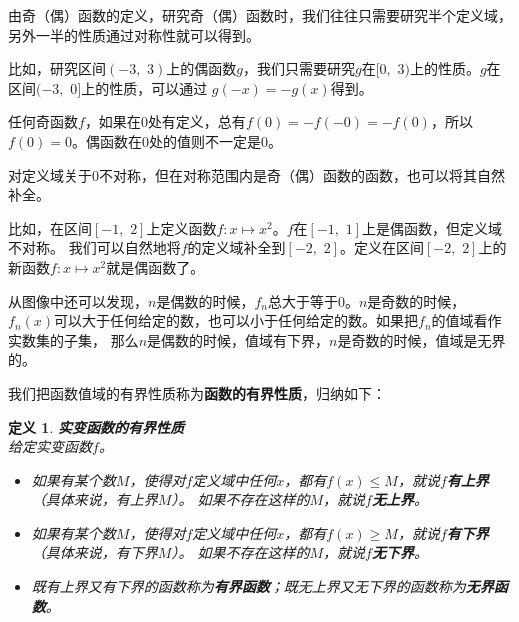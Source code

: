 \documentclass[12pt,UTF8]{ctexbook}
\newtheorem{df}{定义}[section]
\begin{document}
由奇（偶）函数的定义，研究奇（偶）函数时，我们往往只需要研究半个定义域，另外一半的性质通过对称性就可以得到。

比如，研究区间$(-3, \,\,3)$上的偶函数$g$，我们只需要研究$g$在$[0, \,\,3)$上的性质。$g$在区间$(-3,\,\,0]$上的性质，可以通过
$g(-x) = -g(x)$得到。

任何奇函数$f$，如果在$0$处有定义，总有$f(0) = - f(-0) = - f(0)$，所以$f(0) = 0$。偶函数在$0$处的值则不一定是$0$。

对定义域关于$0$不对称，但在对称范围内是奇（偶）函数的函数，也可以将其自然补全。

比如，在区间$[-1,\,\,2]$上定义函数$f: x\mapsto x^2$。$f$在$[-1,\,\,1]$上是偶函数，但定义域不对称。
我们可以自然地将$f$的定义域补全到$[-2,\,\,2]$。定义在区间$[-2,\,\,2]$上的新函数$f: x\mapsto x^2$就是偶函数了。

从图像中还可以发现，$n$是偶数的时候，$f_n$总大于等于$0$。$n$是奇数的时候，
$f_n(x)$可以大于任何给定的数，也可以小于任何给定的数。如果把$f_n$的值域看作实数集的子集，
那么$n$是偶数的时候，值域有下界，$n$是奇数的时候，值域是无界的。

我们把函数值域的有界性质称为\textbf{函数的有界性质}，归纳如下：
\begin{df}\textbf{实变函数的有界性质}\\
    给定实变函数$f$。
    \begin{itemize}
        \item 如果有某个数$M$，使得对$f$定义域中任何$x$，都有$f(x)\leqslant M$，就说$f$\textbf{有上界} （具体来说，有上界$M$）。
        如果不存在这样的$M$，就说$f$\textbf{无上界}。
        \item 如果有某个数$M$，使得对$f$定义域中任何$x$，都有$f(x)\geqslant M$，就说$f$\textbf{有下界} （具体来说，有下界$M$）。
        如果不存在这样的$M$，就说$f$\textbf{无下界}。
        \item 既有上界又有下界的函数称为\textbf{有界函数}；既无上界又无下界的函数称为\textbf{无界函数}。
    \end{itemize}
\end{df}
\end{document}
